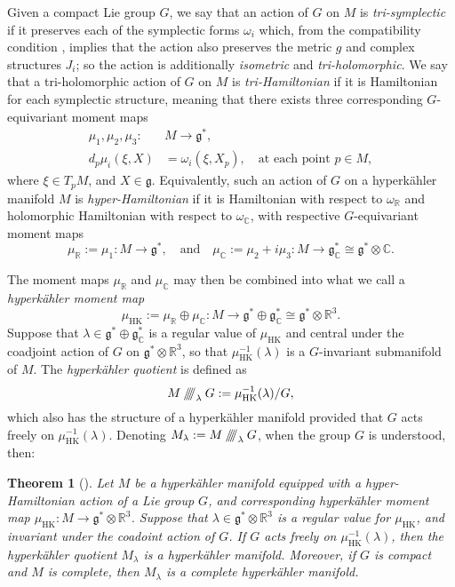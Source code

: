 \documentclass{article}
\newtheorem{theorem}{Theorem}[section]
\newcommand{\ra}{\rightarrow}
\newcommand{\w}{\omega}
\newcommand{\RR}{\mathbb{R}}
\newcommand{\CC}{\mathbb{C}}
\newcommand{\mfg}{\mathfrak{g}}
\newcommand{\sssslash}{\mathbin{/\mkern-6mu/\mkern-6mu/\mkern-6mu/}}
\DeclareMathOperator{\HK}{HK}
\begin{document}
	
	Given a compact Lie group $G$, we say that an action of $G$ on $M$ is \emph{tri-symplectic} if it preserves each of the symplectic forms $\w_{i}$ which, from the compatibility condition , implies that the action also preserves the metric $g$ and complex structures $J_{i}$; so the action is additionally \emph{isometric} and \emph{tri-holomorphic}. We say that a tri-holomorphic action of $G$ on $M$ is \emph{tri-Hamiltonian} if it is Hamiltonian for each symplectic structure, meaning that there exists three corresponding $G$-equivariant moment maps
	\begin{equation}
		\begin{split}
			\mu_{1}, \mu_{2},\mu_{3} : &M \ra \mfg^{\ast}, \\
			d_{p}\mu_{i}(\xi, X) &= \w_{i}(\xi, X_{p}),\quad \text{at each point } p \in M,
		\end{split}
	\end{equation}
	where $\xi \in T_{p}M$, and $X \in \mfg$. Equivalently, such an action of $G$ on a hyperk\"ahler manifold $M$ is \emph{hyper-Hamiltonian} if it is Hamiltonian with respect to $\w_{\RR}$ and holomorphic Hamiltonian with respect to $\w_{\CC}$, with respective $G$-equivariant moment maps 
	\[
		\mu_{\RR} := \mu_{1} : M \ra \mfg^{\ast}, \quad \text{and} \quad \mu_{\CC} := \mu_{2} + i\mu_{3} : M \ra \mfg_{\CC}^{\ast} \cong \mfg^{\ast} \otimes \CC.
	\]
	
	The moment maps $\mu_{\RR}$ and $\mu_{\CC}$ may then be combined into what we call a \emph{hyperk\"ahler moment map}
	\[
		\mu_{\HK} := \mu_{\RR} \oplus \mu_{\CC} : M \ra \mfg^{\ast} \oplus \mfg_{\CC}^{\ast} \cong \mfg^{\ast} \otimes \RR^{3}.
	\]
	Suppose that $\lambda \in \mfg^{\ast} \oplus \mfg_{\CC}^{\ast}$ is a regular value of $\mu_{\HK}$ and central under the coadjoint action of $G$ on $\mfg^{\ast} \otimes \RR^{3}$, so that $\mu_{\HK}^{-1}(\lambda)$ is a $G$-invariant submanifold of $M$. The \emph{hyperk\"ahler quotient} is defined as
	\[
		M \sssslash_{\lambda}G := \mu_{\HK}^{-1}(\lambda)/G,
	\]
	which also has the structure of a hyperk\"ahler manifold provided that $G$ acts freely on $\mu_{\HK}^{-1}(\lambda)$. Denoting $M_{\lambda} := M \sssslash_{\lambda} G$, when the group $G$ is understood, then: 
	
	\begin{theorem}[\cite{HKLR87}]
		Let $M$ be a hyperk\"ahler manifold equipped with a hyper-Hamiltonian action of a Lie group $G$, and corresponding hyperk\"ahler moment map $\mu_{\HK} : M \ra \mfg^{\ast} \otimes \RR^{3}$. Suppose that $\lambda \in \mfg^{\ast} \otimes \RR^{3}$ is a regular value for $\mu_{\HK}$, and invariant under the coadoint action of $G$. If $G$ acts freely on $\mu_{\HK}^{-1}(\lambda)$, then the hyperk\"ahler quotient $M_{\lambda}$ is a hyperk\"ahler manifold. Moreover, if $G$ is compact and $M$ is complete, then $M_{\lambda}$ is a complete hyperk\"ahler manifold.
	\end{theorem}
\end{document}
